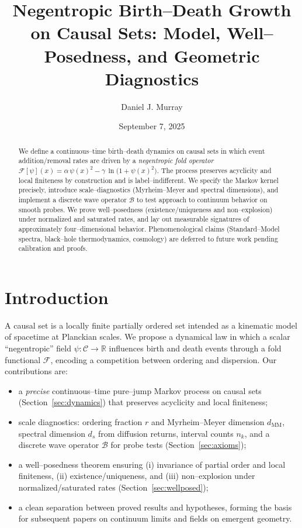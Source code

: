 \documentclass[12pt]{article}
\theoremstyle{definition}
\newcommand{\C}{\mathcal{C}}
\newcommand{\R}{\mathbb{R}}
\newcommand{\Ps}{\psi}
\newcommand{\Fop}{\mathcal{F}}
\newcommand{\Boxd}{\mathcal{B}} %
\begin{document}
\title{Negentropic Birth--Death Growth on Causal Sets: Model, Well--Posedness, and Geometric Diagnostics}
\author{Daniel J. Murray}
\date{September 7, 2025}
\maketitle

\begin{abstract}
We define a continuous--time birth--death dynamics on causal sets in which event addition/removal rates are driven by a \emph{negentropic fold operator} \(\Fop[\Ps](x)=\alpha\,\Ps(x)^2-\gamma\,\ln\bigl(1+\Ps(x)^2\bigr)\). The process preserves acyclicity and local finiteness by construction and is label--indifferent. We specify the Markov kernel precisely, introduce scale--diagnostics (Myrheim--Meyer and spectral dimensions), and implement a discrete wave operator \(\Boxd\) to test approach to continuum behavior on smooth probes. We prove well--posedness (existence/uniqueness and non--explosion) under normalized and saturated rates, and lay out measurable signatures of approximately four--dimensional behavior. Phenomenological claims (Standard--Model spectra, black--hole thermodynamics, cosmology) are deferred to future work pending calibration and proofs.
\end{abstract}

\section{Introduction}
\label{sec:intro}
A causal set is a locally finite partially ordered set intended as a kinematic model of spacetime at Planckian scales. We propose a dynamical law in which a scalar ``negentropic'' field \(\Ps: \C\to\R\) influences birth and death events through a fold functional \(\Fop\), encoding a competition between ordering and dispersion. Our contributions are:
\begin{itemize}[leftmargin=1.2em]
  \item a \emph{precise} continuous--time pure--jump Markov process on causal sets (Section~\ref{sec:dynamics}) that preserves acyclicity and local finiteness;
  \item scale diagnostics: ordering fraction \(r\) and Myrheim--Meyer dimension \(d_{\mathrm{MM}}\), spectral dimension \(d_s\) from diffusion returns, interval counts \(n_k\), and a discrete wave operator \(\Boxd\) for probe tests (Section~\ref{sec:axioms});
  \item a well--posedness theorem ensuring (i) invariance of partial order and local finiteness, (ii) existence/uniqueness, and (iii) non--explosion under normalized/saturated rates (Section~\ref{sec:wellposed});
  \item a clean separation between proved results and hypotheses, forming the basis for subsequent papers on continuum limits and fields on emergent geometry.
\end{itemize}
\end{document}
